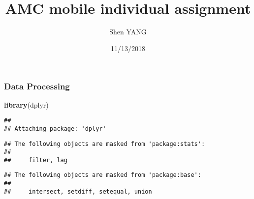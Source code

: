 \documentclass[]{article}
\title{AMC mobile individual assignment}
\author{Shen YANG}
\date{11/13/2018}
\newenvironment{Shaded}{\begin{snugshade}}{\end{snugshade}}
\newcommand{\KeywordTok}[1]{\textcolor[rgb]{0.13,0.29,0.53}{\textbf{#1}}}
\newcommand{\NormalTok}[1]{#1}
\begin{document}
\maketitle

\subsubsection{Data Processing}\label{data-processing}

\begin{Shaded}
\begin{Highlighting}[]
\KeywordTok{library}\NormalTok{(dplyr)}
\end{Highlighting}
\end{Shaded}

\begin{verbatim}
## 
## Attaching package: 'dplyr'
\end{verbatim}

\begin{verbatim}
## The following objects are masked from 'package:stats':
## 
##     filter, lag
\end{verbatim}

\begin{verbatim}
## The following objects are masked from 'package:base':
## 
##     intersect, setdiff, setequal, union
\end{verbatim}
\end{document}
